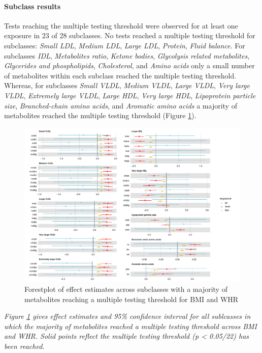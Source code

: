 \documentclass[11pt,twoside]{bristolthesis}
\newcommand{\bsmall}{\begin{small}}
\newcommand{\esmall}{\end{small}}
\begin{document}
\hypertarget{subclass-results}{%
\paragraph{Subclass results}\label{subclass-results}}

Tests reaching the multiple testing threshold were observed for at least one exposure in 23 of 28 subclasses. No tests reached a multiple testing threshold for subclasses: \emph{Small LDL}, \emph{Medium LDL}, \emph{Large LDL}, \emph{Protein}, \emph{Fluid balance}. For subclasses \emph{IDL}, \emph{Metabolites ratio}, \emph{Ketone bodies}, \emph{Glycolysis related metabolites}, \emph{Glycerides and phospholipids}, \emph{Cholesterol}, and \emph{Amino acids} only a small number of metabolites within each subclass reached the multiple testing threshold. Whereas, for subclasses \emph{Small VLDL}, \emph{Medium VLDL}, \emph{Large VLDL}, \emph{Very large VLDL}, \emph{Extremely large VLDL}, \emph{Large HDL}, \emph{Very large HDL}, \emph{Lipoprotein particle size}, \emph{Branched-chain amino acids}, and \emph{Aromatic amino acids} a majority of metabolites reached the multiple testing threshold (Figure \ref{fig:chapter5-figure-forestplot-subclasses}).
\begin{figure}
\includegraphics[width=1\linewidth]{data/chapter5/figures/forestplot_subclasses} \caption{Forestplot of effect estimates across subclasses with a majority of metabolites reaching a multiple testing threshold for BMI and WHR}\label{fig:chapter5-figure-forestplot-subclasses}
\end{figure}
\noindent 
\bsmall
\emph{Figure \ref{fig:chapter5-figure-forestplot-subclasses} gives effect estimates and 95\% confidence interval for all sublcasses in which the majority of metabolites reached a multiple testing threshold across BMI and WHR. Solid points reflect the multiple testing threshold (p \textless{} 0.05/22) has been reached.}
\esmall
\end{document}
